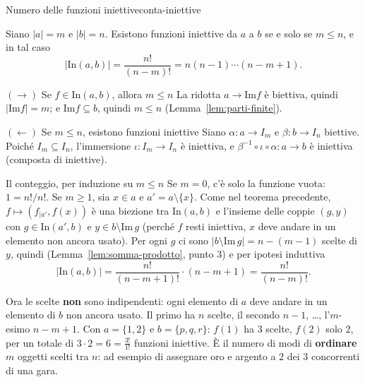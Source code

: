 \begin{concetto}
\begin{Teorema}{Numero delle funzioni iniettive}{conta-iniettive}
    \begin{prerequisiti}
    \end{prerequisiti}
    Siano $|a| = m$ e $|b| = n$. Esistono funzioni iniettive da $a$ a $b$ se e solo se $m \leq n$, e in tal caso
    \[ |\mathrm{In}(a, b)| = \frac{n!}{(n - m)!} = n(n - 1) \cdots (n - m + 1). \]
\end{Teorema}
\begin{dimostrazione}
    \begin{caso}{$(\rightarrow)$ Se $f \in \mathrm{In}(a, b)$, allora $m \leq n$}
        La ridotta $a \to \mathrm{Im} f$ è biettiva, quindi $|\mathrm{Im} f| = m$; e $\mathrm{Im} f \subseteq b$, quindi $m \leq n$ (Lemma~\ref{lem:parti-finite}).
    \end{caso}
    \begin{caso}{$(\leftarrow)$ Se $m \leq n$, esistono funzioni iniettive}
        Siano $\alpha \colon a \to I_m$ e $\beta \colon b \to I_n$ biettive. Poiché $I_m \subseteq I_n$, l'immersione $\iota \colon I_m \to I_n$ è iniettiva,
        e $\beta^{-1} \circ \iota \circ \alpha \colon a \to b$ è iniettiva (composta di iniettive).
    \end{caso}
    \begin{caso}{Il conteggio, per induzione su $m \leq n$}
        Se $m = 0$, c'è solo la funzione vuota: $1 = n!/n!$. Se $m \geq 1$, sia $x \in a$ e $a' = a \setminus \{x\}$. Come nel teorema
        precedente, $f \mapsto (f_{|a'}, f(x))$ è una biezione tra $\mathrm{In}(a, b)$ e l'insieme delle coppie $(g, y)$ con $g \in \mathrm{In}(a', b)$ e
        $y \in b \setminus \mathrm{Im}\, g$ (perché $f$ resti iniettiva, $x$ deve andare in un elemento non ancora usato). Per ogni $g$ ci sono
        $|b \setminus \mathrm{Im}\, g| = n - (m - 1)$ scelte di $y$, quindi (Lemma~\ref{lem:somma-prodotto}, punto 3) e per ipotesi induttiva
        \[ |\mathrm{In}(a, b)| = \frac{n!}{(n - m + 1)!} \cdot (n - m + 1) = \frac{n!}{(n - m)!}. \]
    \end{caso}
\end{dimostrazione}
\end{concetto}

\begin{spiegazione}
    Ora le scelte \textbf{non} sono indipendenti: ogni elemento di $a$ deve andare in un elemento di $b$ non ancora usato. Il primo
    ha $n$ scelte, il secondo $n - 1$, \dots, l'$m$-esimo $n - m + 1$. Con $a = \{1, 2\}$ e $b = \{p, q, r\}$: $f(1)$ ha $3$ scelte, $f(2)$
    solo $2$, per un totale di $3 \cdot 2 = 6 = \frac{3!}{1!}$ funzioni iniettive. È il numero di modi di \textbf{ordinare} $m$ oggetti
    scelti tra $n$: ad esempio di assegnare oro e argento a $2$ dei $3$ concorrenti di una gara.
\end{spiegazione}


